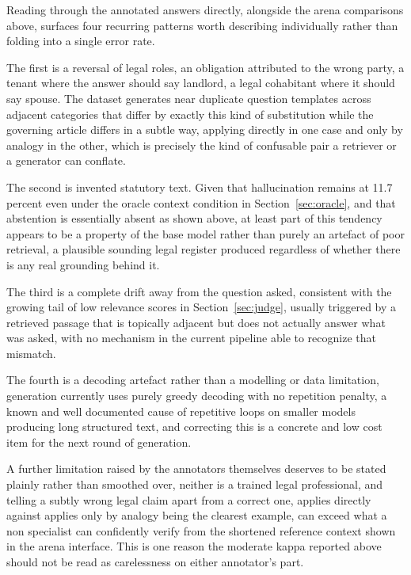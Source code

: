\documentclass[11pt, a4paper]{article}
\begin{document}
Reading through the annotated answers directly, alongside the arena comparisons above, surfaces four recurring patterns worth describing individually rather than folding into a single error rate.

The first is a reversal of legal roles, an obligation attributed to the wrong party, a tenant where the answer should say landlord, a legal cohabitant where it should say spouse. The dataset generates near duplicate question templates across adjacent categories that differ by exactly this kind of substitution while the governing article differs in a subtle way, applying directly in one case and only by analogy in the other, which is precisely the kind of confusable pair a retriever or a generator can conflate.

The second is invented statutory text. Given that hallucination remains at 11.7 percent even under the oracle context condition in Section~\ref{sec:oracle}, and that abstention is essentially absent as shown above, at least part of this tendency appears to be a property of the base model rather than purely an artefact of poor retrieval, a plausible sounding legal register produced regardless of whether there is any real grounding behind it.

The third is a complete drift away from the question asked, consistent with the growing tail of low relevance scores in Section~\ref{sec:judge}, usually triggered by a retrieved passage that is topically adjacent but does not actually answer what was asked, with no mechanism in the current pipeline able to recognize that mismatch.

The fourth is a decoding artefact rather than a modelling or data limitation, generation currently uses purely greedy decoding with no repetition penalty, a known and well documented cause of repetitive loops on smaller models producing long structured text, and correcting this is a concrete and low cost item for the next round of generation.

A further limitation raised by the annotators themselves deserves to be stated plainly rather than smoothed over, neither is a trained legal professional, and telling a subtly wrong legal claim apart from a correct one, applies directly against applies only by analogy being the clearest example, can exceed what a non specialist can confidently verify from the shortened reference context shown in the arena interface. This is one reason the moderate kappa reported above should not be read as carelessness on either annotator's part.
\end{document}
